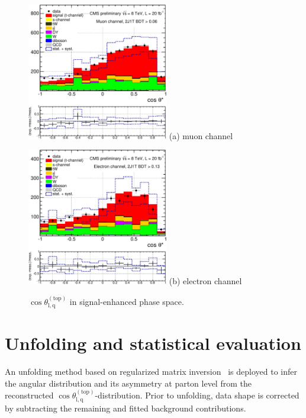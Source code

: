 \documentclass[a4paper]{jpconf}
\newcommand{\costheta}[0]{\cos\theta_{\mathrm{l,q}}^{\mathrm{(top)}}}
\begin{document}
\begin{figure}[h]
\begin{center}
\begin{minipage}{7cm}
\includegraphics[height=6.0cm]{2j1t_cosTheta_mu-crop}
\center (a) muon channel
\end{minipage}\hspace{1cm}%
\begin{minipage}{7cm}
\includegraphics[height=6.0cm]{2j1t_cosTheta_el-crop}
\center (b) electron channel
\end{minipage} 
\caption{\label{fig:recocostheta}$\costheta$ in signal-enhanced phase space.}
\end{center}
\end{figure}


\section{Unfolding and statistical evaluation}
An unfolding method based on regularized matrix inversion~\cite{tunfold} is deployed to infer the angular distribution and its asymmetry at parton level from the reconstructed $\costheta$-distribution. Prior to unfolding, data shape is corrected by subtracting the remaining and fitted background contributions.
\end{document}
